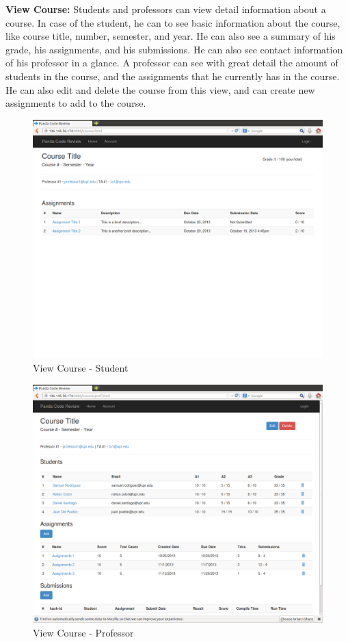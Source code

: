 \textbf{View Course:} Students and professors can view detail information
about a course. In case of the student, he can to see basic information
about the course, like course title, number, semester, and year. He can also see
a summary of his grade, his assignments, and his submissions. He can also see
contact information of his professor in a glance. A professor can see with great
detail the amount of students in the course, and the assignments that he
currently has in the course. He can also edit and delete the course from this
view, and can create new assignments to add to the course.

\begin{figure}[H]
	\centering
	\includegraphics[width=\textwidth]{img/course}
	\caption{View Course - Student}
\end{figure}

\begin{figure}[H]
	\centering
	\includegraphics[width=\textwidth]{img/course-prof}
	\caption{View Course - Professor}
\end{figure}

